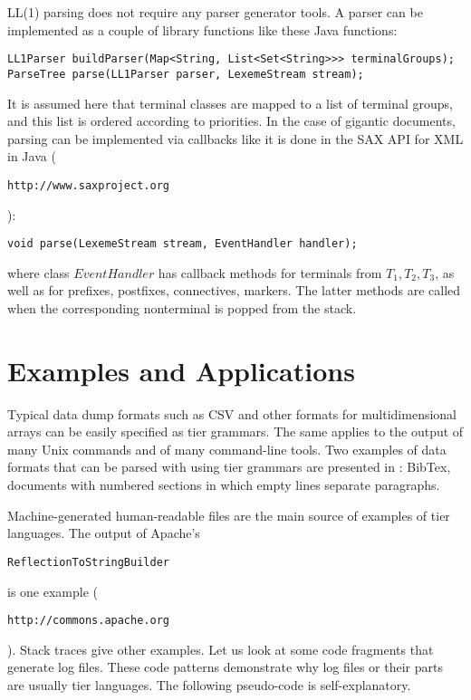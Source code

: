 \documentclass{llncs}
\begin{document}
LL(1) parsing does not require any parser generator tools. A parser can be implemented as a couple of library functions like these Java functions:
\begin{small}
\begin{verbatim}
LL1Parser buildParser(Map<String, List<Set<String>>> terminalGroups);
ParseTree parse(LL1Parser parser, LexemeStream stream);
\end{verbatim}
\end{small}
It is assumed here that terminal classes are mapped to a list of terminal groups, and this list is ordered according to priorities. In the case of gigantic documents, parsing can be implemented via callbacks like it is done in the SAX API for XML in Java (\begin{small}\texttt{http://www.saxproject.org}\end{small}):
\begin{small}
\begin{verbatim}
void parse(LexemeStream stream, EventHandler handler);
\end{verbatim}
\end{small}
where class $EventHandler$ has callback methods for terminals from $T_1, T_2, T_3$, as well as for prefixes, postfixes, connectives, markers. The latter methods are called when the corresponding nonterminal is popped from the stack.

\section{Examples and Applications}

Typical data dump formats such as CSV and other formats for multidimensional arrays can be easily specified as tier grammars. The same applies to the output of many Unix commands and of many command-line tools. Two examples of data formats that can be parsed with using tier grammars are presented in \cite{Sakharov15}: BibTex, documents with numbered sections in which empty lines separate paragraphs.

Machine-generated human-readable files are the main source of examples of tier languages. The output of Apache's \begin{small}\texttt{ReflectionToStringBuilder}\end{small} is one example (\begin{small}\texttt{http://commons.apache.org}\end{small}). Stack traces give other examples. Let us look at some code fragments that generate log files. These code patterns demonstrate why log files or their parts are usually tier languages. The following pseudo-code is self-explanatory. 
\end{document}
